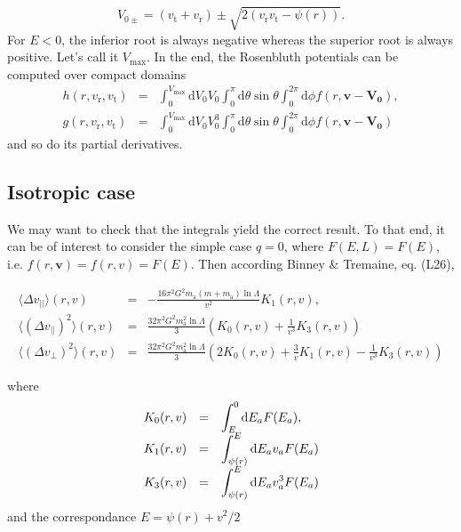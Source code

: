 \documentclass[11pt]{article}
\newcommand{\rt}{\mathrm{t}}
\newcommand{\rr}{\mathrm{r}}
\newcommand{\ra}{\mathrm{a}}
\newcommand{\rd}{{\mathrm{d}}}
\newcommand{\vr}{v_{\rr}}
\newcommand{\vt}{v_{\rt}}
\newcommand{\Vmax}{V_{\max}}
\newcommand{\ma}{m_{\ra}}
\newcommand{\bV}[1]{\boldsymbol{V_{#1}}}
\newcommand{\bv}{\boldsymbol{v}}
\newcommand{\dvPar}{\Delta v_{||}}
\newcommand{\dvPerp}{\Delta v_{\perp}}
\newcommand{\dvParAvrLoc}{\langle \dvPar \rangle}
\newcommand{\dvParSqAvrLoc}{\langle(\dvPar)^{2}\rangle}
\newcommand{\dvPerpSqAvrLoc}{\langle(\dvPerp)^{2}\rangle}
\begin{document}
\begin{equation}
  V_{0 \pm} = (\vt+\vr)\pm\sqrt{2(\vr\vt-\psi(r))}.
  \label{eq:Vmax}
\end{equation}
For $E<0$, the inferior root is always negative whereas the superior root is always positive. Let's call it $\Vmax$. In the end, the Rosenbluth potentials can be computed over compact domains
\begin{equation}
  \boxed{
\begin{array}{ccl}
  h(r,\vr,\vt) &=& \displaystyle{\int_{0}^{\Vmax}{\rd}V_{0} V_{0}\int_{0}^{\pi}{\rd}\theta\sin\theta\int_{0}^{2\pi}{\rd}\phi f(r,\bv-\bV0)} ,\\
  g(r,\vr,\vt) &=& \displaystyle{\int_{0}^{\Vmax}{\rd}V_{0} V_{0}^{3}\int_{0}^{\pi}{\rd}\theta\sin\theta\int_{0}^{2\pi}{\rd}\phi f(r,\bv-\bV0)}
\end{array}
}
\label{eq:Rosenbluth_finite}
\end{equation}
and so do its partial derivatives.

\subsection{Isotropic case}
\label{subsec:Isotropic}

We may want to check that the integrals yield the correct result.
To that end, it can be of interest to consider the simple case $q=0$,
where $F(E,L)=F(E)$, i.e. $f(r,\bv)=f(r,v)=F(E)$.
Then according Binney \& Tremaine, eq. (L26),

\begin{equation}
\begin{array}{ccl}
  \dvParAvrLoc(r,v) & =&\displaystyle{-\frac{16\pi^{2}G^{2}\ma(m+\ma)\ln\Lambda}{v^{2}}K_{1}(r,v)} ,\\
  
  \dvParSqAvrLoc(r,v) & = &\displaystyle{\frac{32\pi^{2}G^{2}\ma^{2}\ln\Lambda}{3}\left(K_{0}(r,v)+\frac{1}{v^{3}}K_{3}(r,v)\right)}\\
  
  \dvPerpSqAvrLoc(r,v) & = &\displaystyle{\frac{32\pi^{2}G^{2}\ma^{2}\ln\Lambda}{3}\left(2K_{0}(r,v)+\frac{3}{v}K_{1}(r,v)-\frac{1}{v^{3}}K_{3}(r,v)\right)}   
\end{array}
\label{eq:IsoLocDiffCoefsdRdT}
\end{equation}

where
\begin{equation}
\begin{array}{ccl}
 K_{0}(r,v) & =&\displaystyle{\int_{E}^{0}{\rm d}E_{a}F(E_{a})} ,\\
  
  K_{1}(r,v) & = &\displaystyle{\int_{\psi(r)}^{E}{\rm d}E_{a}v_{a}F(E_{a})}\\
  
  K_{3}(r,v) & = &\displaystyle{\int_{\psi(r)}^{E}{\rm d}E_{a}v_{a}^{3}F(E_{a})}   
\end{array}
\label{eq:K_Iso}
\end{equation}
and the correspondance $E = \psi(r)+v^{2}/2$
\end{document}

